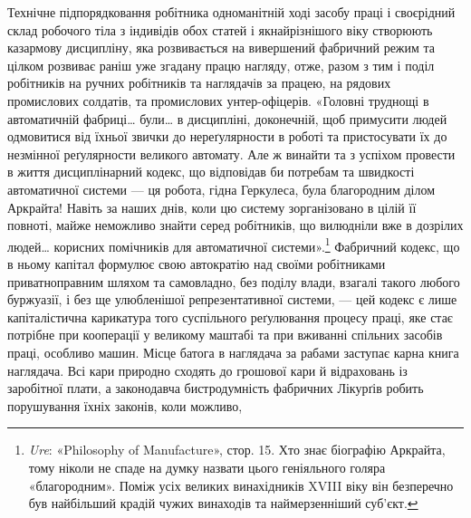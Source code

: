 Технічне підпорядковання робітника одноманітній ході засобу
праці і своєрідний склад робочого тіла з індивідів обох статей
і якнайрізнішого віку створюють казармову дисципліну, яка
розвивається на вивершений фабричний режим та цілком розвиває
раніш уже згадану працю нагляду, отже, разом з тим і
поділ робітників на ручних робітників та наглядачів за працею,
на рядових промислових солдатів, та промислових унтер-офіцерів.
«Головні труднощі в автоматичній фабриці\dots{} були\dots{} в дисципліні,
доконечній, щоб примусити людей одмовитися від їхньої
звички до нереґулярности в роботі та пристосувати їх до незмінної
реґулярности великого автомату. Але ж винайти та з успіхом
провести в життя дисциплінарний кодекс, що відповідав би
потребам та швидкості автоматичної системи — ця робота, гідна
Геркулеса, була благородним ділом Аркрайта! Навіть за наших
днів, коли цю систему зорганізовано в цілій її повноті, майже
неможливо знайти серед робітників, що вилюдніли вже в дозрілих
людей\dots{} корисних помічників для автоматичної системи».\footnote{
\emph{Ure}: «Philosophy of Manufacture», стор. 15. Хто знає біографію
Аркрайта, тому ніколи не спаде на думку назвати цього геніяльного
голяра «благородним». Поміж усіх великих винахідників XVIII віку
він безперечно був найбільший крадій чужих винаходів та наймерзенніший
суб’єкт.
}
Фабричний кодекс, що в ньому капітал формулює свою автократію
над своїми робітниками приватноправним шляхом та самовладно,
без поділу влади, взагалі такого любого буржуазії, і
без ще улюбленішої репрезентативної системи, — цей кодекс є
лише капіталістична карикатура того суспільного реґулювання
процесу праці, яке стає потрібне при кооперації у великому маштабі
та при вживанні спільних засобів праці, особливо машин.
Місце батога в наглядача за рабами заступає карна книга наглядача.
Всі кари природно сходять до грошової кари й відраховань
із заробітної плати, а законодавча бистродумність фабричних
Лікурґів робить порушування їхніх законів, коли можливо,
